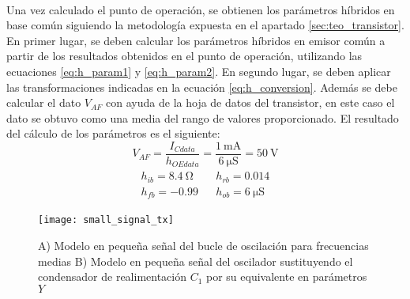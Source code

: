 \paragraph{}
Una vez calculado el punto de operaci\'on, se obtienen los par\'ametros h\'ibridos en base com\'un siguiendo la metodolog\'ia expuesta en el apartado \ref{sec:teo_transistor}. En primer lugar, se deben calcular los parámetros híbridos en emisor común a partir de los resultados obtenidos en el punto de operación, utilizando las ecuaciones \ref{eq:h_param1} y \ref{eq:h_param2}. En segundo lugar, se deben aplicar las transformaciones indicadas en la ecuaci\'on \ref{eq:h_conversion}. Adem\'as se debe calcular el dato $V_{AF}$ con ayuda de la hoja de datos del transistor, en este caso el dato se obtuvo como una media del rango de valores proporcionado. El resultado del c\'alculo de los par\'ametros es el siguiente:
\begin{equation}
   \label{eq:result_pol1}
V_{AF} = \frac{I_{Cdata}}{h_{OEdata}} =\frac{\SI{1}{\milli\ampere}}{\SI{6}{\micro\siemens}} =  \SI{50}{\volt} 
\end{equation}
\begin{equation}
   \label{eq:result_pol2}
\begin{array}{rl} 
      \begin{array}{l}
	 h_{ib} =  \SI{8.4}{\ohm} \\
	 h_{fb} =  -0.99
      \end{array}
      &
      \begin{array}{l}
	 h_{rb} =  0.014 \\
	 h_{ob} =  \SI{6}{\micro\siemens}
      \end{array}
\end{array}
\end{equation}

\begin{figure}[h]
    \centering
    \texttt{[image: small\_signal\_tx]}
    \caption{A) Modelo en pequeña señal del bucle de oscilación para frecuencias medias B) Modelo en pequeña señal del oscilador sustituyendo el condensador de realimentación $C_1$ por su equivalente en parámetros $Y$}
    \label{fig:ss_tx}
\end{figure}

